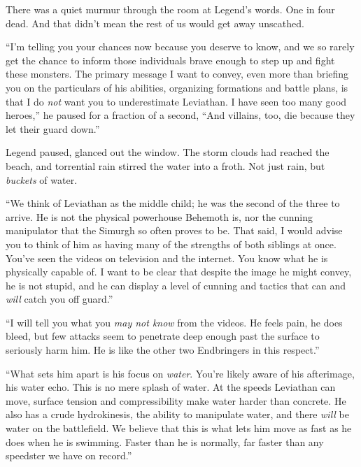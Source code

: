 





There was a quiet murmur through the room at Legend's words.  One in four dead.  And that didn't mean the rest of us would get away unscathed.



``I'm telling you your chances now because you deserve to know, and we so rarely get the chance to inform those individuals brave enough to step up and fight these monsters.  The primary message I want to convey, even more than briefing you on the particulars of his abilities, organizing formations and battle plans, is that I do \emph{not} want you to underestimate Leviathan.  I have seen too many good heroes,'' he paused for a fraction of a second, ``And villains, too, die because they let their guard down.''



Legend paused, glanced out the window.  The storm clouds had reached the beach, and torrential rain stirred the water into a froth.  Not just rain, but \emph{buckets }of water.



``We think of Leviathan as the middle child; he was the second of the three to arrive.    He is not the physical powerhouse Behemoth is, nor the cunning manipulator that the Simurgh so often proves to be.  That said, I would advise you to think of him as having many of the strengths of both siblings at once.  You've seen the videos on television and the internet.  You know what he is physically capable of.  I want to be clear that despite the image he might convey, he is not stupid, and he can display a level of cunning and tactics that can and \emph{will} catch you off guard.''



``I will tell you what you \emph{may not know} from the videos.  He feels pain, he does bleed, but few attacks seem to penetrate deep enough past the surface to seriously harm him.  He is like the other two Endbringers in this respect.''



``What sets him apart is his focus on \emph{water}.  You're likely aware of his afterimage, his water echo.  This is no mere splash of water.  At the speeds Leviathan can move, surface tension and compressibility make water harder than concrete.  He also has a crude hydrokinesis, the ability to manipulate water, and there \emph{will} be water on the battlefield.  We believe that this is what lets him move as fast as he does when he is swimming.  Faster than he is normally, far faster than any speedster we have on record.''



